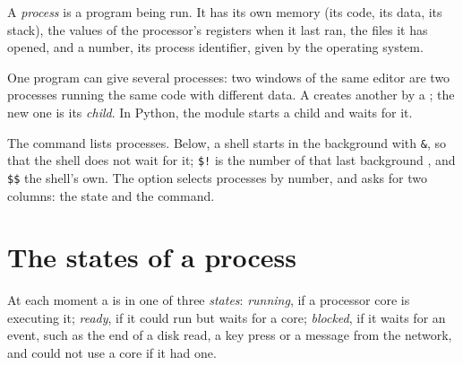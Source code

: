 \begin{definition}[Process]\label{def:g12:processes-and-scheduling:process}
A \emph{process} is a program being run. It has its own memory (its code, its data, its stack), the
values of the processor's registers when it last ran, the files it has opened, and a number, its process identifier,
given by the operating system.
\end{definition}

One program can give several processes: two windows of the same editor are two processes running the same code with
different data. A  creates another by a ; the new one is its \emph{child}. In Python, the module
 starts a child and waits for it.

\label{lst:g12:processes-and-scheduling:spawn}

\label{out:g12:processes-and-scheduling:spawn}

The command  lists processes. Below, a shell starts  in the background with \texttt{\&}, so that
the shell does not wait for it; \texttt{\$!} is the number of that last background , and \texttt{\$\$} the
shell's own. The option  selects processes by number, and  asks for two columns: the
state and the command.

\label{out:g12:processes-and-scheduling:ps}

\section{The states of a process}\label{sec:g12:processes-and-scheduling:states}

\begin{definition}\label{def:g12:processes-and-scheduling:states}
At each moment a  is in one of three \emph{states}:
\emph{running}, if a processor core is executing it; \emph{ready}, if it could run but waits for a core;
\emph{blocked}, if it waits for an event, such as the end of a disk read, a key press or a message from the network,
and could not use a core if it had one.
\end{definition}

